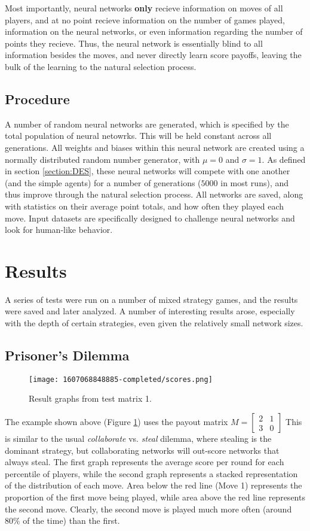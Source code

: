 \documentclass{article}
\begin{document}
Most importantly, neural networks \textbf{only} recieve information on moves of all players, and at no point recieve information on the number of games played, information on the neural networks, or even information regarding the number of points they recieve. Thus, the neural network is essentially blind to all information besides the moves, and never directly learn score payoffs, leaving the bulk of the learning to the natural selection process.

\subsection{Procedure}
A number of random neural networks are generated, which is specified by the total population of neural netowrks. This will be held constant across all generations. All weights and biases within this neural network are created using a normally distributed random number generator, with $\mu=0$ and $\sigma=1$. As defined in section \ref{section:DES}, these neural networks will compete with one another (and the simple agents) for a number of generations ($5000$ in most runs), and thus improve through the natural selection process. All networks are saved, along with statistics on their average point totals, and how often they played each move. Input datasets are specifically designed to challenge neural networks and look for human-like behavior.

\section{Results}
A series of tests were run on a number of mixed strategy games, and the results were saved and later analyzed. A number of interesting results arose, especially with the depth of certain strategies, even given the relatively small network sizes.

\subsection{Prisoner's Dilemma}
\begin{figure}[h]
	\centering\texttt{[image: 1607068848885-completed/scores.png]}
  \caption{Result graphs from test matrix 1.}
  \label{fig:1607068848885-graphs}
\end{figure}

The example shown above (Figure \ref{fig:1607068848885-graphs}) uses the payout matrix $M=
\begin{bmatrix}
  2 & 1\\
  3 & 0
\end{bmatrix}$ This is similar to the usual \textit{collaborate} vs. \textit{steal} dilemma, where stealing is the dominant strategy, but collaborating networks will out-score networks that always steal. The first graph represents the average score per round for each percentile of players, while the second graph represents a stacked representation of the distribution of each move. Area below the red line (Move 1) represents the proportion of the first move being played, while area above the red line represents the second move. Clearly, the second move is played much more often (around $80\%$ of the time) than the first.
\end{document}
